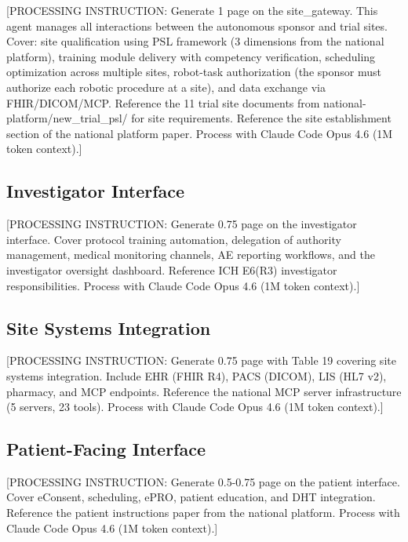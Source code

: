 [PROCESSING INSTRUCTION: Generate 1 page on the site\_gateway. This agent manages all
interactions between the autonomous sponsor and trial sites. Cover: site qualification
using PSL framework (3 dimensions from the national platform), training module delivery
with competency verification, scheduling optimization across multiple sites, robot-task
authorization (the sponsor must authorize each robotic procedure at a site), and data
exchange via FHIR/DICOM/MCP. Reference the 11 trial site documents from
national-platform/new\_trial\_psl/ for site requirements. Reference the site establishment
section of the national platform paper. Process with Claude Code Opus 4.6
(1M token context).]

\subsection{Investigator Interface}

[PROCESSING INSTRUCTION: Generate 0.75 page on the investigator interface. Cover protocol
training automation, delegation of authority management, medical monitoring channels,
AE reporting workflows, and the investigator oversight dashboard. Reference ICH E6(R3)
investigator responsibilities. Process with Claude Code Opus 4.6 (1M token context).]

\subsection{Site Systems Integration}

[PROCESSING INSTRUCTION: Generate 0.75 page with Table 19 covering site systems integration.
Include EHR (FHIR R4), PACS (DICOM), LIS (HL7 v2), pharmacy, and MCP endpoints.
Reference the national MCP server infrastructure (5 servers, 23 tools).
Process with Claude Code Opus 4.6 (1M token context).]

\subsection{Patient-Facing Interface}

[PROCESSING INSTRUCTION: Generate 0.5-0.75 page on the patient interface. Cover eConsent,
scheduling, ePRO, patient education, and DHT integration. Reference the patient
instructions paper from the national platform.
Process with Claude Code Opus 4.6 (1M token context).]
